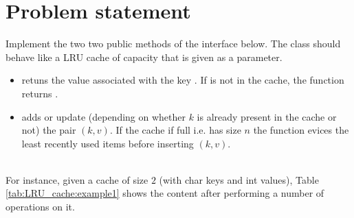 \section{Problem statement}
\begin{exercise}
\label{example:LRU_cache:exercice1}
Implement the two two public methods of the  interface below. The class should behave like a LRU cache of capacity  that is given as a parameter.
\begin{itemize}
	\item {} retuns the value associated with the key . If  is not in the cache, the function returns . 
	\item {} adds or update (depending on whether $k$ is already present in the cache or not) the pair $(k,v)$. If the cache if full i.e. has size $n$ the function evices the least recently used items before inserting $(k,v)$.
\end{itemize}

	\begin{example}
		\label{example:LRU_cache:example1}
		\hfill \\ 
		For instance, given a cache  of size $2$ (with char keys and int values), Table \ref{tab:LRU_cache:example1} shows the content after performing a number of operations on it.		
	\end{example}


\end{exercise}

